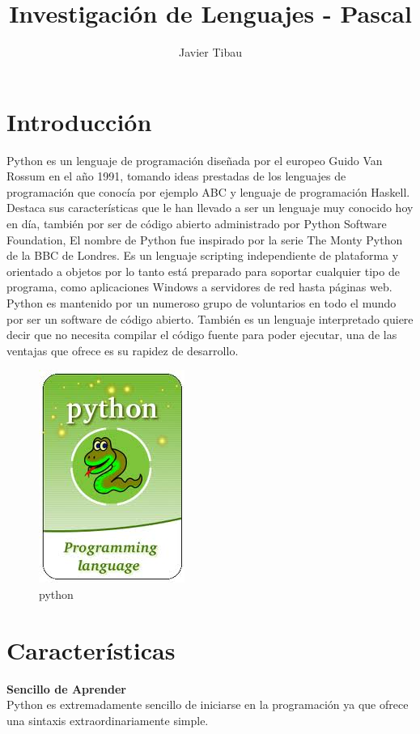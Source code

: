 \documentclass[11pt]{article} %
\title{Investigación de Lenguajes - Pascal}
\author{Javier Tibau}
\begin{document}
\maketitle

\section{Introducción}
Python es un lenguaje de programación diseñada por el europeo Guido Van Rossum en el año 1991, tomando ideas prestadas de los lenguajes de programación que conocía por ejemplo ABC y lenguaje de programación Haskell.
Destaca sus características que le han llevado a ser un lenguaje muy conocido hoy en día, también por ser de código abierto administrado por Python Software Foundation, El nombre de Python fue inspirado por la serie The Monty Python de la BBC de Londres.
Es un lenguaje scripting independiente de plataforma y orientado a objetos  por lo tanto está preparado para soportar cualquier tipo de programa, como aplicaciones Windows a servidores de red hasta páginas web.
Python es mantenido por un numeroso grupo de voluntarios en todo el mundo por ser un software de código abierto.  También es un lenguaje interpretado quiere decir que no necesita compilar el código fuente para poder ejecutar, una de las ventajas que ofrece es su rapidez de desarrollo.
\begin{figure}[htbp]
\begin{center}
\includegraphics[width=.30\textwidth]{./imagenes/pythonXD.jpg}
\caption{python}
\label{qt}
\end{center}
\end{figure}

\section{Características}

\textbf{Sencillo de Aprender}
\\    Python es extremadamente sencillo de iniciarse en la programación ya que ofrece una sintaxis extraordinariamente simple.\\
\end{document}
